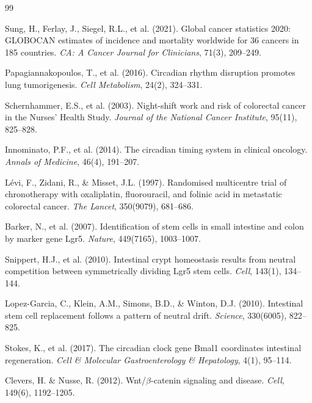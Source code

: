 \documentclass[11pt,letterpaper]{article}
\begin{document}
\begin{thebibliography}{99}

Sung, H., Ferlay, J., Siegel, R.L., et al. (2021).
Global cancer statistics 2020: GLOBOCAN estimates of incidence and mortality worldwide for 36 cancers in 185 countries.
\textit{CA: A Cancer Journal for Clinicians}, 71(3), 209--249.

Papagiannakopoulos, T., et al. (2016).
Circadian rhythm disruption promotes lung tumorigenesis.
\textit{Cell Metabolism}, 24(2), 324--331.

Schernhammer, E.S., et al. (2003).
Night-shift work and risk of colorectal cancer in the Nurses' Health Study.
\textit{Journal of the National Cancer Institute}, 95(11), 825--828.

Innominato, P.F., et al. (2014).
The circadian timing system in clinical oncology.
\textit{Annals of Medicine}, 46(4), 191--207.

L{\'e}vi, F., Zidani, R., \& Misset, J.L. (1997).
Randomised multicentre trial of chronotherapy with oxaliplatin, fluorouracil, and folinic acid in metastatic colorectal cancer.
\textit{The Lancet}, 350(9079), 681--686.

Barker, N., et al. (2007).
Identification of stem cells in small intestine and colon by marker gene Lgr5.
\textit{Nature}, 449(7165), 1003--1007.

Snippert, H.J., et al. (2010).
Intestinal crypt homeostasis results from neutral competition between symmetrically dividing Lgr5 stem cells.
\textit{Cell}, 143(1), 134--144.

Lopez-Garcia, C., Klein, A.M., Simons, B.D., \& Winton, D.J. (2010).
Intestinal stem cell replacement follows a pattern of neutral drift.
\textit{Science}, 330(6005), 822--825.

Stokes, K., et al. (2017).
The circadian clock gene Bmal1 coordinates intestinal regeneration.
\textit{Cell \& Molecular Gastroenterology \& Hepatology}, 4(1), 95--114.

Clevers, H. \& Nusse, R. (2012).
Wnt/$\beta$-catenin signaling and disease.
\textit{Cell}, 149(6), 1192--1205.


\end{thebibliography}
\end{document}
